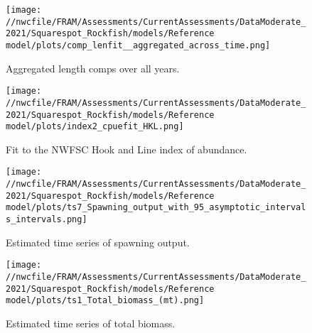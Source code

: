 \documentclass[11pt,
  english,
  a4paper,
]{article}
\begin{document}

\begin{figure}
\centering
\texttt{[image: //nwcfile/FRAM/Assessments/CurrentAssessments/DataModerate\_2021/Squarespot\_Rockfish/models/Reference model/plots/comp\_lenfit\_\_aggregated\_across\_time.png]}
\caption{Aggregated length comps over all years.\label{fig:agg-len-fit}}
\end{figure}

\tagmcend\tagstructend


\begin{figure}
\centering
\texttt{[image: //nwcfile/FRAM/Assessments/CurrentAssessments/DataModerate\_2021/Squarespot\_Rockfish/models/Reference model/plots/index2\_cpuefit\_HKL.png]}
\caption{Fit to the NWFSC Hook and Line index of abundance.\label{fig:hkl-index-fit}}
\end{figure}

\tagmcend\tagstructend


\begin{figure}
\centering
\texttt{[image: //nwcfile/FRAM/Assessments/CurrentAssessments/DataModerate\_2021/Squarespot\_Rockfish/models/Reference model/plots/ts7\_Spawning\_output\_with\_95\_asymptotic\_intervals\_intervals.png]}
\caption{Estimated time series of spawning output.\label{fig:ssb}}
\end{figure}

\tagmcend\tagstructend


\begin{figure}
\centering
\texttt{[image: //nwcfile/FRAM/Assessments/CurrentAssessments/DataModerate\_2021/Squarespot\_Rockfish/models/Reference model/plots/ts1\_Total\_biomass\_(mt).png]}
\caption{Estimated time series of total biomass.\label{fig:tot-bio}}
\end{figure}

\tagmcend\tagstructend
\end{document}

